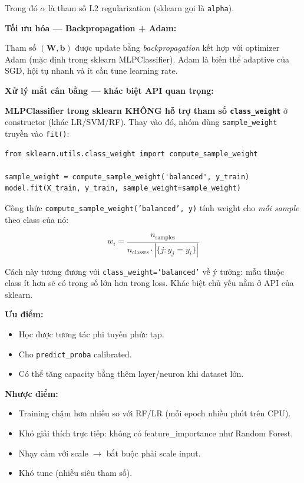 \documentclass[12pt, a4paper]{article}
\begin{document}
Trong đó $\alpha$ là tham số L2 regularization (sklearn gọi là \texttt{alpha}).

\textbf{Tối ưu hóa --- Backpropagation + Adam:}

Tham số $(\mathbf{W}, \mathbf{b})$ được update bằng \emph{backpropagation} kết hợp với optimizer Adam (mặc định trong sklearn MLPClassifier). Adam là biến thể adaptive của SGD, hội tụ nhanh và ít cần tune learning rate.

\textbf{Xử lý mất cân bằng --- khác biệt API quan trọng:}

\textbf{MLPClassifier trong sklearn KHÔNG hỗ trợ tham số \texttt{class\_weight}} ở constructor (khác LR/SVM/RF). Thay vào đó, nhóm dùng \texttt{sample\_weight} truyền vào \texttt{fit()}:

\begin{lstlisting}[caption={Cách dùng sample\_weight cho MLP}]
from sklearn.utils.class_weight import compute_sample_weight

sample_weight = compute_sample_weight('balanced', y_train)
model.fit(X_train, y_train, sample_weight=sample_weight)
\end{lstlisting}

Công thức \texttt{compute\_sample\_weight('balanced', y)} tính weight cho \emph{mỗi sample} theo class của nó:

\begin{equation}
w_i = \frac{n_{\text{samples}}}{n_{\text{classes}} \cdot |\{j : y_j = y_i\}|}
\end{equation}

Cách này tương đương với \texttt{class\_weight='balanced'} về ý tưởng: mẫu thuộc class ít hơn sẽ có trọng số lớn hơn trong loss. Khác biệt chủ yếu nằm ở API của sklearn.

\textbf{Ưu điểm:}
\begin{itemize}
    \item Học được tương tác phi tuyến phức tạp.
    \item Cho \texttt{predict\_proba} calibrated.
    \item Có thể tăng capacity bằng thêm layer/neuron khi dataset lớn.
\end{itemize}

\textbf{Nhược điểm:}
\begin{itemize}
    \item Training chậm hơn nhiều so với RF/LR (mỗi epoch nhiều phút trên CPU).
    \item Khó giải thích trực tiếp: không có feature\_importance như Random Forest.
    \item Nhạy cảm với scale $\to$ bắt buộc phải scale input.
    \item Khó tune (nhiều siêu tham số).
\end{itemize}
\end{document}
